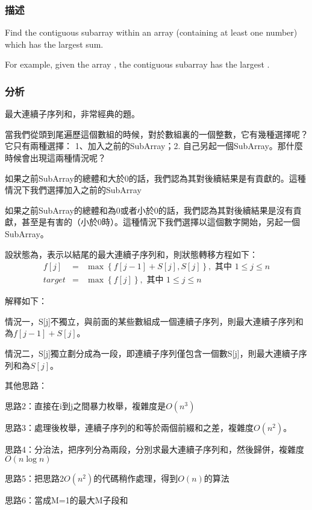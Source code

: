 \subsubsection{描述}
Find the contiguous subarray within an array (containing at least one number) which has the largest sum.

For example, given the array \code{\[−2,1,−3,4,−1,2,1,−5,4\]},
the contiguous subarray \code{\[4,−1,2,1\]} has the largest .


\subsubsection{分析}
最大連續子序列和，非常經典的題。

當我們從頭到尾遍歷這個數組的時候，對於數組裏的一個整數，它有幾種選擇呢？它只有兩種選擇： 1、加入之前的SubArray；2. 自己另起一個SubArray。那什麼時候會出現這兩種情況呢？

如果之前SubArray的總體和大於0的話，我們認為其對後續結果是有貢獻的。這種情況下我們選擇加入之前的SubArray

如果之前SubArray的總體和為0或者小於0的話，我們認為其對後續結果是沒有貢獻，甚至是有害的（小於0時）。這種情況下我們選擇以這個數字開始，另起一個SubArray。

設狀態為，表示以結尾的最大連續子序列和，則狀態轉移方程如下：
\begin{eqnarray}
f[j] &=& \max\left\{f[j-1]+S[j],S[j]\right\}, \text{ 其中 }1 \leq j \leq n \nonumber \\
target &=& \max\left\{f[j]\right\}, \text{ 其中 }1 \leq j \leq n \nonumber
\end{eqnarray}

解釋如下：
\begindot
\item 情況一，S[j]不獨立，與前面的某些數組成一個連續子序列，則最大連續子序列和為$f[j-1]+S[j]$。
\item 情況二，S[j]獨立劃分成為一段，即連續子序列僅包含一個數S[j]，則最大連續子序列和為$S[j]$。
\myenddot  

其他思路：
\begindot
\item 思路2：直接在i到j之間暴力枚舉，複雜度是$O(n^3)$
\item 思路3：處理後枚舉，連續子序列的和等於兩個前綴和之差，複雜度$O(n^2)$。
\item 思路4：分治法，把序列分為兩段，分別求最大連續子序列和，然後歸併，複雜度$O(n\log n)$
\item 思路5：把思路2$O(n^2)$的代碼稍作處理，得到$O(n)$的算法
\item 思路6：當成M=1的最大M子段和
\myenddot


